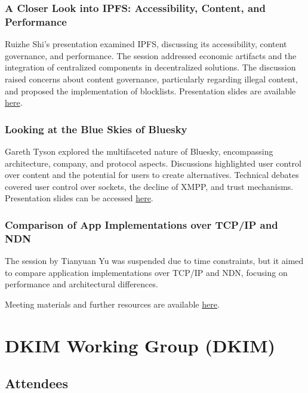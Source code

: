 \documentclass{article}
\begin{document}
\subsubsection{A Closer Look into IPFS: Accessibility, Content, and Performance}
Ruizhe Shi's presentation examined IPFS, discussing its accessibility, content governance, and performance. The session addressed economic artifacts and the integration of centralized components in decentralized solutions. The discussion raised concerns about content governance, particularly regarding illegal content, and proposed the implementation of blocklists. Presentation slides are available \href{https://datatracker.ietf.org/meeting/122/materials/slides-122-dinrg-a-closer-look-into-ipfs-accessibility-content-and-performance-00}{here}.

\subsubsection{Looking at the Blue Skies of Bluesky}
Gareth Tyson explored the multifaceted nature of Bluesky, encompassing architecture, company, and protocol aspects. Discussions highlighted user control over content and the potential for users to create alternatives. Technical debates covered user control over sockets, the decline of XMPP, and trust mechanisms. Presentation slides can be accessed \href{https://datatracker.ietf.org/meeting/122/materials/slides-122-dinrg-bluesky-00.pdf}{here}.

\subsubsection{Comparison of App Implementations over TCP/IP and NDN}
The session by Tianyuan Yu was suspended due to time constraints, but it aimed to compare application implementations over TCP/IP and NDN, focusing on performance and architectural differences.

Meeting materials and further resources are available \href{https://datatracker.ietf.org/meeting/122/session/dinrg}{here}.



\newpage

\section{DKIM Working Group (DKIM)}

\subsection{Attendees}
\end{document}
